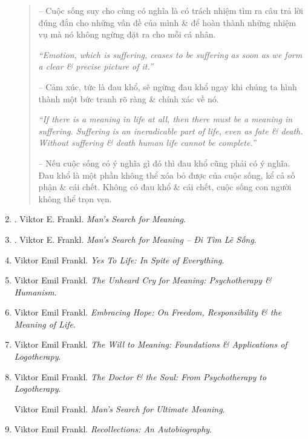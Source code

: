 \documentclass{article}
\begin{document}
\begin{enumerate}
\begin{quotation}
		-- Cuộc sống suy cho cùng có nghĩa là có trách nhiệm tìm ra câu trả lời đúng đắn cho những vấn đề của mình \& để hoàn thành những nhiệm vụ mà nó không ngừng đặt ra cho mỗi cá nhân.
		
		{\it``Emotion, which is suffering, ceases to be suffering as soon as we form a clear \& precise picture of it.''}
		
		-- Cảm xúc, tức là đau khổ, sẽ ngừng đau khổ ngay khi chúng ta hình thành một bức tranh rõ ràng \& chính xác về nó.
		
		{\it``If there is a meaning in life at all, then there must be a meaning in suffering. Suffering is an ineradicable part of life, even as fate \& death. Without suffering \& death human life cannot be complete.''}
		
		-- Nếu cuộc sống có ý nghĩa gì đó thì đau khổ cũng phải có ý nghĩa. Đau khổ là một phần không thể xóa bỏ được của cuộc sống, kể cả số phận \& cái chết. Không có đau khổ \& cái chết, cuộc sống con người không thể trọn vẹn.
	\end{quotation}
	
	\item \cite{Frankl_meaning_revised}. {\sc Viktor E. Frankl}. {\it Man's Search for Meaning}.\hfill{\sf[reading]}
	
	\item \cite{Frankl_meaning_VN}. {\sc Viktor E. Frankl}. {\it Man's Search for Meaning -- Đi Tìm Lẽ Sống}.\hfill{\sf[done]}
	
	\item {\sc Viktor Emil Frankl}. {\it Yes To Life: In Spite of Everything}.
	
	\item {\sc Viktor Emil Frankl}. {\it The Unheard Cry for Meaning: Psychotherapy \& Humanism}.
	
	\item {\sc Viktor Emil Frankl}. {\it Embracing Hope: On Freedom, Responsibility \& the Meaning of Life}.
	
	\item {\sc Viktor Emil Frankl}. {\it The Will to Meaning: Foundations \& Applications of Logotherapy}.
	
	\item {\sc Viktor Emil Frankl}. {\it The Doctor \& the Soul: From Psychotherapy to Logotherapy}.
	
	{\sc Viktor Emil Frankl}. {\it Man's Search for Ultimate Meaning}.
	
	\item {\sc Viktor Emil Frankl}. {\it Recollections: An Autobiography}.
	

\end{enumerate}
\end{document}
